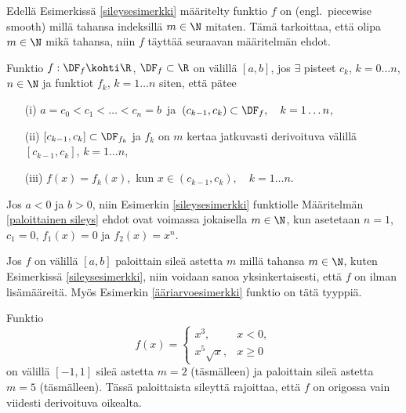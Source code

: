 Edellä Esimerkissä \ref{sileysesimerkki} määritelty funktio $f$ on
 (engl.\ piecewise smooth) millä tahansa indeksillä $m\in\N$ mitaten.
Tämä tarkoittaa, että olipa $m\in\N$ mikä tahansa, niin $f$ täyttää seuraavan määritelmän ehdot.
\begin{Def} \label{paloittainen sileys} 
Funktio $f:\DF_f\kohti\R$, $\DF_f\subset\R$ on  välillä $[a,b]$, jos $\exists$ pisteet $c_k$, $k=0 \ldots n$, $n\in\N$ ja 
funktiot $f_k$, $k=1 \ldots n$ siten, että pätee
\begin{itemize}
\item[(i)]   $a=c_0<c_1<\ldots<c_n=b$\, ja $\,(c_{k-1},c_k)\subset\DF_f, \quad k=1 \ldots n$,
\item[(ii)]  $[c_{k-1},c_k]\subset\DF_{f_k}$ ja $f_k$ on $m$ kertaa jatkuvasti derivoituva
             välillä $[c_{k-1},c_k]$, $k=1\ldots n$,
\item[(iii)] $f(x)=f_k(x)$, \,kun $x\in (c_{k-1},c_k), \quad k=1 \ldots n$.
\end{itemize}
\end{Def}
\begin{Exa} Jos $a<0$ ja $b>0$, niin Esimerkin \ref{sileysesimerkki} funktiolle Määritelmän 
\ref{paloittainen sileys} ehdot ovat voimassa jokaisella $m\in\N$, kun asetetaan $n=1$,
$c_1=0$, $f_1(x)=0$ ja $f_2(x) = x^n$. \loppu 
\end{Exa}
Jos $f$ on välillä $[a,b]$ paloittain sileä astetta $m$ millä tahansa $m\in\N$, kuten 
Esimerkissä \ref{sileysesimerkki}, niin voidaan sanoa yksinkertaisesti, että $f$ on 
 ilman lisämääreitä. Myös Esimerkin \ref{ääriarvoesimerkki} funktio on 
tätä tyyppiä.
\begin{Exa}
Funktio
\[
f(x)=\begin{cases}
x^3, &x<0, \\
x^5\sqrt{x}, &x\geq 0
\end{cases}
\]
on välillä $[-1,1]$ sileä astetta $m=2$ (täsmälleen) ja paloittain sileä astetta $m=5$ 
(täsmälleen). Tässä paloittaista sileyttä rajoittaa, että $f$ on origossa vain viidesti 
derivoituva oikealta. \loppu
\end{Exa}

